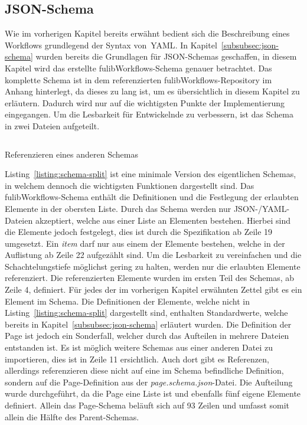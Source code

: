 \subsection{JSON-Schema}\label{subsec:schema}
Wie im vorherigen Kapitel bereits erwähnt bedient sich die Beschreibung eines Workflows grundlegend der Syntax von~\ac{YAML}.
In Kapitel~\ref{subsubsec:json-schema} wurden bereits die Grundlagen für JSON-Schemas geschaffen, in diesem Kapitel wird das erstellte
fulibWorkflows-Schema genauer betrachtet.
Das komplette Schema ist in dem referenzierten fulibWorkflows-Repository im Anhang hinterlegt, da dieses zu lang ist, um es übersichtlich in diesem Kapitel zu erläutern.
Dadurch wird nur auf die wichtigsten Punkte der Implementierung eingegangen.
Um die Lesbarkeit für Entwickelnde zu verbessern, ist das Schema in zwei Dateien aufgeteilt.

\begin{listing}[!ht]
    \inputminted{json}{listings/3.1.2/page.json}
    \caption{Referenzieren eines anderen Schemas}
    \label{listing:schema-split}
\end{listing}

Listing~\ref{listing:schema-split} ist eine minimale Version des eigentlichen Schemas, in welchem dennoch die wichtigsten Funktionen dargestellt sind.
Das fulibWorkflows-Schema enthält die Definitionen und die Festlegung der erlaubten Elemente in der obersten Liste.
Durch das Schema werden nur JSON-/YAML-Dateien akzeptiert, welche aus einer Liste an Elementen bestehen.
Hierbei sind die Elemente jedoch festgelegt, dies ist durch die Spezifikation ab Zeile 19 umgesetzt.
Ein \textit{item} darf nur aus einem der Elemente bestehen, welche in der Auflistung ab Zeile 22 aufgezählt sind.
Um die Lesbarkeit zu vereinfachen und die Schachtelungstiefe möglichst gering zu halten, werden nur die erlaubten Elemente referenziert.
Die referenzierten Elemente wurden im ersten Teil des Schemas, ab Zeile 4, definiert.
Für jedes der im vorherigen Kapitel erwähnten Zettel gibt es ein Element im Schema.
Die Definitionen der Elemente, welche nicht in Listing~\ref{listing:schema-split} dargestellt sind, enthalten Standardwerte, welche bereits in Kapitel~\ref{subsubsec:json-schema} erläutert wurden.
Die Definition der Page ist jedoch ein Sonderfall, welcher durch das Aufteilen in mehrere Dateien entstanden ist.
Es ist möglich weitere Schemas aus einer anderen Datei zu importieren, dies ist in Zeile 11 ersichtlich.
Auch dort gibt es Referenzen, allerdings referenzieren diese nicht auf eine im Schema befindliche Definition, sondern auf die Page-Definition aus der \textit{page.schema.json}-Datei.
Die Aufteilung wurde durchgeführt, da die Page eine Liste ist und ebenfalls fünf eigene Elemente definiert.
Allein das Page-Schema beläuft sich auf 93 Zeilen und umfasst somit allein die Hälfte des Parent-Schemas.

